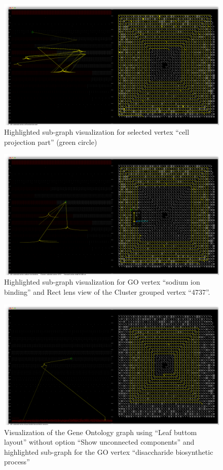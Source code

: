 \newpage
\begin{figure}[h!]
\centering
\includegraphics[scale=0.33, angle=90]{pictures/screenshot_4.png}
\caption{Highlighted sub-graph visualization for selected vertex ``cell projection part'' (green circle)}
\end{figure}

\newpage
\begin{figure}[h!]
\centering
\includegraphics[scale=0.33, angle=90]{pictures/screenshot_5.png}
\caption{Highlighted sub-graph visualization for GO vertex ``sodium ion binding'' and Rect lens view of the Cluster grouped vertex ``4737''.}
\end{figure}

\newpage
\begin{figure}[h!]
\centering
\includegraphics[scale=0.33, angle=90]{pictures/screenshot_6.png}
\caption{Visualization of the Gene Ontology graph using ``Leaf buttom layout'' without option ``Show unconnected components'' and highlighted sub-graph for the GO vertex ``disaccharide biosynthetic process''}
\end{figure}